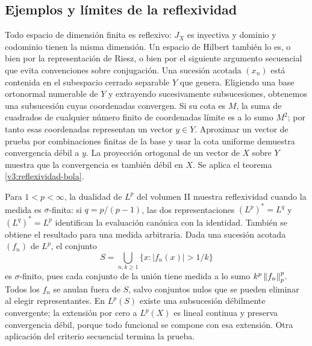 \subsection{Ejemplos y límites de la reflexividad}
Todo espacio de dimensión finita es reflexivo: $J_X$ es inyectiva y dominio y codominio tienen la misma dimensión. Un espacio de Hilbert también lo es, o bien por la representación de Riesz, o bien por el siguiente argumento secuencial que evita convenciones sobre conjugación. Una sucesión acotada $(x_n)$ está contenida en el subespacio cerrado separable $Y$ que genera. Eligiendo una base ortonormal numerable de $Y$ y extrayendo sucesivamente subsucesiones, obtenemos una subsucesión cuyas coordenadas convergen. Si su cota es $M$, la suma de cuadrados de cualquier número finito de coordenadas límite es a lo sumo $M^2$; por tanto esas coordenadas representan un vector $y\in Y$. Aproximar un vector de prueba por combinaciones finitas de la base y usar la cota uniforme demuestra convergencia débil a $y$. La proyección ortogonal de un vector de $X$ sobre $Y$ muestra que la convergencia es también débil en $X$. Se aplica el teorema \ref{v3:reflexividad-bola}.

Para $1<p<\infty$, la dualidad de $L^p$ del volumen II muestra reflexividad cuando la medida es $\sigma$-finita: si $q=p/(p-1)$, las dos representaciones $(L^p)^*=L^q$ y $(L^q)^*=L^p$ identifican la evaluación canónica con la identidad. También se obtiene el resultado para una medida arbitraria. Dada una sucesión acotada $(f_n)$ de $L^p$, el conjunto
\[
 S=\bigcup_{n,k\geq1}\{x:|f_n(x)|>1/k\}
\]
es $\sigma$-finito, pues cada conjunto de la unión tiene medida a lo sumo $k^p\left\lVert f_n\right\rVert_p^p$. Todos los $f_n$ se anulan fuera de $S$, salvo conjuntos nulos que se pueden eliminar al elegir representantes. En $L^p(S)$ existe una subsucesión débilmente convergente; la extensión por cero a $L^p(X)$ es lineal continua y preserva convergencia débil, porque todo funcional se compone con esa extensión. Otra aplicación del criterio secuencial termina la prueba.

